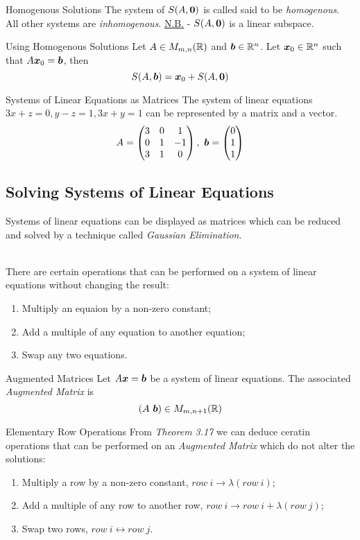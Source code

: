\documentclass[11pt,a4paper]{article}
\begin{document}
\subtitle{Definition 3.14 - }{Homogenous Solutions}
The system of $S(A, \boldsymbol{0})$ is called said to be \textit{homogenous}. All other systems are \textit{inhomogenous}.
\underline{N.B.} - $S(A, \boldsymbol{0})$ is a linear subspace. \\

\subtitle{Theorem 3.15 - }{Using Homogenous Solutions}
Let $A \in M_{m,n}(\mathbb{R})$ and $\boldsymbol{b} \in \mathbb{R}^n$. Let $\boldsymbol{x}_0 \in \mathbb{R}^n$ such that $A\boldsymbol{x}_0 = \boldsymbol{b}$, then
$$S(A, \boldsymbol{b}) = {\boldsymbol{x}_0} + S(A, \boldsymbol{0})$$

\subtitle{Remark 3.16 - }{Systems of Linear Equations as Matrices}
The system of linear equations $3x + z = 0, y - z = 1, 3x + y = 1$ can be represented by a matrix and a vector.
$$A = \begin{pmatrix}
3 & 0 & 1 \\
0 & 1 & -1 \\
3 & 1 & 0
\end{pmatrix},\ \boldsymbol{b} = \begin{pmatrix}
0 \\ 1 \\ 1
\end{pmatrix}$$

\subsection{Solving Systems of Linear Equations}
Systems of linear equations can be displayed as matrices which can be reduced and solved by a technique called \textit{Gaussian Elimination}. \\ \\
%
\subtitle{Theorem 3.17}{}
There are certain operations that can be performed on a system of linear equations without changing the result:
\begin{enumerate}[label=\roman*)]
  \item Multiply an equaion by a non-zero constant;
  \item Add a multiple of any equation to another equation;
  \item Swap any two equations.
\end{enumerate}

\subtitle{Definition 3.18 - }{Augmented Matrices}
Let $A\boldsymbol{x} = \boldsymbol{b}$ be a system of linear equations. The associated \textit{Augmented Matrix} is $$(A\ \boldsymbol{b}) \in M_{m, n+1}(\mathbb{R})$$

\subtitle{Theorem 3.19 - }{Elementary Row Operations}
From \textit{Theorem 3.17} we can deduce ceratin operations that can be performed on an \textit{Augmented Matrix} which do not alter the solutions:
\begin{enumerate}[label=\roman*)]
  \item Multiply a row by a non-zero constant, $row\ i \to \lambda(row\ i)$;
  \item Add a multiple of any row to another row, $row\ i \to row\ i + \lambda(row\ j)$;
  \item Swap two rows, $row\ i \leftrightarrow row\ j $.
\end{enumerate}
\end{document}
